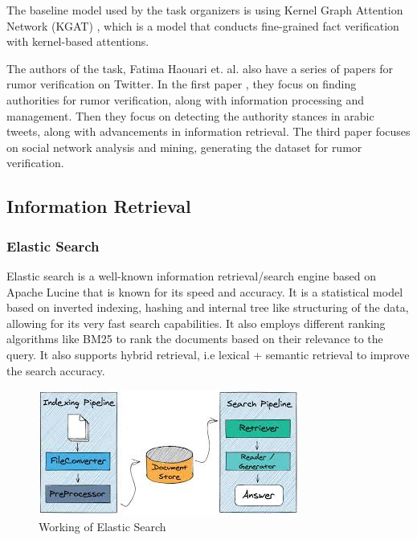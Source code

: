 \documentclass[conference]{IEEEtran}
\begin{document}
The baseline model used by the task organizers is using Kernel Graph Attention Network (KGAT) \cite{kgat}, which is a model that conducts fine-grained  fact verification with kernel-based attentions.

The authors of the task, Fatima Haouari et. al. also have a series of papers for rumor verification on Twitter. In the first paper \cite{fh1}, they focus on finding authorities for rumor verification, along with information processing and management. Then \cite{fh2} they focus on detecting the authority stances in arabic tweets, along with advancements in information retrieval. The third paper \cite{fh3} focuses on social network analysis and mining, generating the dataset for rumor verification.

\subsection{Information Retrieval}
\subsubsection{Elastic Search}
Elastic search\cite{elastic-search} is a well-known information retrieval/search engine based on Apache Lucine that is known for its speed and accuracy. It is a statistical model based on inverted indexing, hashing and internal tree like structuring of the data, allowing for its very fast search capabilities. It also employs different ranking algorithms like BM25 to rank the documents based on their relevance to the query. It also supports hybrid retrieval, i.e lexical + semantic retrieval to improve the search accuracy.
\begin{figure}[htp]
    \centering
    \includegraphics[width=\columnwidth]{images/ES.png}
    \caption{Working of Elastic Search\cite{es-image}}
    \label{fig:es}
\end{figure} 
\end{document}
